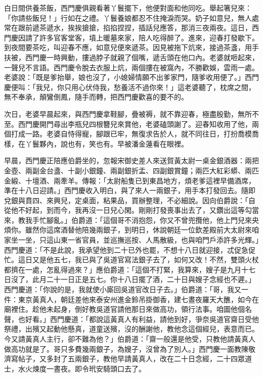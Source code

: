 白日間供養茶飯，西門慶俱親看著丫鬟擺下，他便對面和他同吃。舉起箸兒來：「你請些飯兒！」行如在之禮。丫鬟養娘都忍不住掩淚而哭。奶子如意兒，無人處常在跟前遞茶遞水，挨挨搶搶，掐掐捏捏，插話兒應答，那消三夜兩夜。這日，西門慶因請了許多官客堂客，墳上暖墓來家，陪人吃得醉了。進來，迎春打發歇下。到夜間要茶吃，叫迎春不應，如意兒便來遞茶。因見被拖下炕來，接過茶盞，用手扶被，西門慶一時興動，摟過脖子就親了個嘴，遞舌頭在他口內。老婆就咂起來，一聲兒不言語。西門慶令脫去衣服上炕，兩個摟在被窩內，不勝歡娛，雲雨一處。老婆說：「既是爹抬舉，娘也沒了，小媳婦情願不出爹家門，隨爹收用便了。」西門慶便叫：「我兒，你只用心伏侍我，愁養活不過你來！」這老婆聽了，枕席之間，無不奉承，顛鸞倒鳳，隨手而轉，把西門慶歡喜的要不的。

次日，老婆早晨起來，與西門慶拿鞋腳，疊被褥，就不靠迎春，極盡殷勤，無所不至。西門慶開門尋出李瓶兒四根簪兒來賞他，老婆磕頭謝了。迎春知收用了他，兩個打成一路。老婆自恃得寵，腳跟已牢，無復求告於人，就不同往日，打扮喬模喬樣，在丫鬟夥內，說也有，笑也有。早被潘金蓮看在眼裡。

早晨，西門慶正陪應伯爵坐的，忽報宋御史差人來送賀黃太尉一桌金銀酒器：兩把金壺、兩副金台盞、十副小銀鐘、兩副銀折盂、四副銀賞鐘；兩匹大紅彩蟒、兩匹金緞、十壇酒、兩牽羊。傳報：「太尉船隻已到東昌地方，煩老爹這裡早備酒席，準在十八日迎請。」西門慶收入明白，與了來人一兩銀子，用手本打發回去。隨即兌銀與賁四、來興兒，定桌面，粘果品，買辦整理，不必細說。因向伯爵說：「自從他不好起，到而今，我再沒一日兒心閑。剛剛打發喪事出去了，又鑽出這等勾當來，教我手忙腳亂。」伯爵道：「這個哥不消抱怨，你又不曾兜攬他，他上門兒來央煩你。雖然你這席酒替他陪幾兩銀子，到明日，休說朝廷一位欽差殿前大太尉來咱家坐一坐，只這山東一省官員，並巡撫巡按、人馬散級，也與咱門戶添許多光輝。」西門慶道：「不是此說，我承望他到二十已外也罷，不想十八日就迎接，忒促急促忙。這日又是他五七，我已與了吳道官寫法銀子去了，如何又改！不然，雙頭火杖都擠在一處，怎亂得過來？」應伯爵道：「這個不打緊，我算來，嫂子是九月十七日沒了，此月二十一日正是五七。你十八日擺了酒，二十日與嫂子念經也不遲。」西門慶道：「你說的是，我就使小廝回吳道官改日子去。」伯爵道：「哥，我又一件：東京黃真人，朝廷差他來泰安州進金鈴吊掛御香，建七晝夜羅天大醮，如今在廟裡住。趁他未起身，倒好教吳道官請他那日來做高功，領行法事。咱圖他個名聲，也好看。」西門慶道：「都說這黃真人有利益，請他到好，爭奈吳道官齋日受他祭禮，出殯又起動他懸真，道童送殯，沒的酬謝他，教他念這個經兒，表意而已。今又請黃真人主行，卻不難為他？」伯爵道：「齋一般還是他受，只教他請黃真人做高功就是了。哥只多費幾兩銀子，為嫂子，沒曾為了別人。」西門慶一面教陳敬濟寫帖子，又多封了五兩銀子，教他早請黃真人，改在二十日念經，二十四眾道士，水火煉度一晝夜。即令玳安騎頭口去了。


